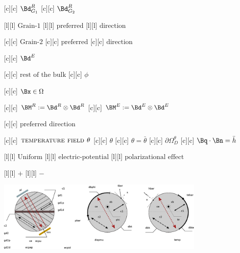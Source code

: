 [c][c] {\small $\Bd^{R}_{G_1}$}
[c][c] {\small $\Bd^{R}_{G_2}$}

[l][l] {\small $\text{Grain-1}$}
[l][l] {\small $\text{preferred}$}
[l][l] {\small $\text{direction}$}

[c][c] {\small$\text{Grain-2}$}
[c][c] {\small$\text{preferred}$}
[c][c] {\small$\text{direction}$}

[c][c] {\small $\Bd^{E}$}

[c][c] {\small $\text{rest of the bulk}$}
[c][c] {\small $\phi$}

[c][c] {\small $\Bx \in \Omega$}

[c][c] {\small $\BM^{R} := \Bd^{R} \otimes \Bd^{R}$}
[c][c] {\small $\BM^{E} := \Bd^{E} \otimes \Bd^{E}$}

[c][c] {\small $\text{preferred direction}$}

[c][c] {\small $\textsc{temperature field } \theta$}
[c][c] {\small $\theta$}
[c][c] {\small $\theta = \bar{\theta}$}
[c][c] {\small $\partial\Omega^{\theta}_{D}$}
[c][c] {\small $\Bq\cdot\Bn = \bar{h}$}

[l][l] {\small $\text{Uniform}$}
[l][l] {\small $\text{electric-potential}$}
[l][l] {\small $\text{polarizational effect}$}

[l][l] {\small $+$}
[l][l] {\small $-$}

\includegraphics[width=0.77\textwidth]{structuraltwofields.eps}
